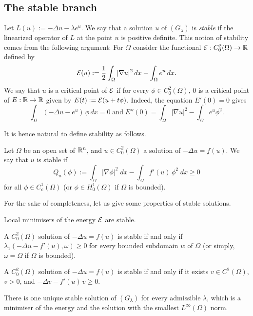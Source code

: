 
\subsection{The stable branch}\label{sec:stable-branch}

Let $L(u):=-\Delta u - \lambda e ^ u$. We say that a solution $u$ of
$(G_\lambda)$ is \textit{stable} if the linearized operator of $L$ at the point
$u$ is positive definite. This notion of stability comes from the following
argument: For $\Omega$ consider the functional $\mathcal{E}:C_0^2(\Omega)\to\mathbb{R}$
defined by
\begin{equation}
    \mathcal{E}(u):= \frac{1}{2}\int_\Omega |\nabla u|^2\, dx - \int_\Omega e^u\, dx.
\end{equation}
We say that $u$ is a critical point of $\mathcal{E}$ if for every $\phi\in
C_0^2(\Omega)$, $0$ is a critical point of $E:\mathbb{R}\to \mathbb{R}$ given by
$E(t):=\mathcal{E}(u+t\phi)$. Indeed, the equation $E'(0)=0$ gives
\begin{equation}
    \int_\Omega (-\Delta u-e^u)\,\phi \, dx = 0\; \mbox{and}\;
    E''(0)=\int_\Omega|\nabla u|^2 - \int_\Omega e^u\phi^2.
\end{equation}

It is hence natural to define stability as follows.

\begin{definition} Let $\Omega$ be an open set of $\mathbb{R}^n$, and $u\in
    C_0^2(\Omega)$ a solution of $-\Delta u = f(u)$. We say that $u$ is stable
    if
    \[
        Q_u(\phi):=\int_\Omega|\nabla \phi|^2\;dx - \int_\Omega f'(u)\,\phi^2\;dx
        \geq 0
    \]
    for all $\phi\in C_c^1(\Omega)$ (or $\phi\in H_0^1(\Omega)$ if $\Omega$ is
    bounded).
\end{definition}

For the sake of completeness, let us give some properties of stable solutions.

\begin{proposition} Local minimisers of the energy $\mathcal{E}$ are stable.
\end{proposition}

\begin{proposition} A $C_0^2(\Omega)$ solution of $-\Delta u = f(u)$ is stable
    if and only if $\lambda_1(-\Delta u-f'(u),\omega)\geq 0$ for every bounded
    subdomain $w$ of $\Omega$ (or simply, $\omega=\Omega$ if $\Omega$ is
    bounded).
\end{proposition}
\begin{proposition} A $C_0^2(\Omega)$ solution of $-\Delta u = f(u)$ is stable
    if and only if it exists $v\in C^2(\Omega)$, $v>0$, and $-\Delta v -f'(u)\,
    v\geq 0$.
\end{proposition}
\begin{proposition} There is one unique stable solution of $(G_\lambda)$ for
    every admissible $\lambda$, which is a minimiser of the energy and the
    solution with the smallest $L^\infty(\Omega)$ norm.
\end{proposition}

